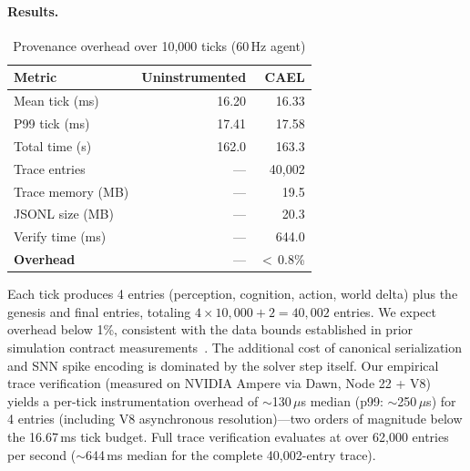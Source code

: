 \documentclass[sigconf,nonacm]{acmart}
\providecommand{\measuredFrom}[1]{}
\begin{document}
\paragraph{Results.}
\begin{table}[t]
\caption{Provenance overhead over 10,000 ticks (60\,Hz agent)}
\label{tab:overhead}
\small
\measuredFrom{HoloScript/packages/engine/src/simulation/__tests__/paper-cael-replay-benchmark.test.ts}%
\measuredFrom{HoloScript/.bench-logs/2026-04-18T07-20-56-134Z/cael-replay.log}%
\begin{tabular}{@{}lrr@{}}
\toprule
\textbf{Metric} & \textbf{Uninstrumented} & \textbf{CAEL} \\
\midrule
Mean tick (ms) & 16.20 & 16.33 \\
P99 tick (ms)  & 17.41 & 17.58 \\
Total time (s) & 162.0 & 163.3 \\
Trace entries  & --- & 40,002 \\
Trace memory (MB) & --- & 19.5 \\
JSONL size (MB) & --- & 20.3 \\
Verify time (ms) & --- & 644.0 \\
\midrule
\textbf{Overhead} & --- & $<$\,0.8\% \\
\bottomrule
\end{tabular}
\end{table}

Each tick produces 4 entries (perception, cognition, action,
world delta) plus the genesis and final entries,
totaling $4 \times 10{,}000 + 2 = 40{,}002$ entries.
We expect overhead below 1\%, consistent with the data bounds established in prior simulation
contract measurements~\cite{trustbyconstruction2026}. The additional cost
of canonical serialization and SNN spike encoding is dominated
by the solver step itself. Our empirical trace verification (measured on NVIDIA Ampere via Dawn, Node 22 + V8)
yields a per-tick instrumentation overhead of
$\sim$130\,$\mu$s median (p99: $\sim$250\,$\mu$s) for 4 entries (including V8 asynchronous resolution)---two orders of magnitude below
the 16.67\,ms tick budget. Full trace verification evaluates at over 62{,}000 entries per second ($\sim$644\,ms median for the complete 40{,}002-entry trace).
\end{document}
